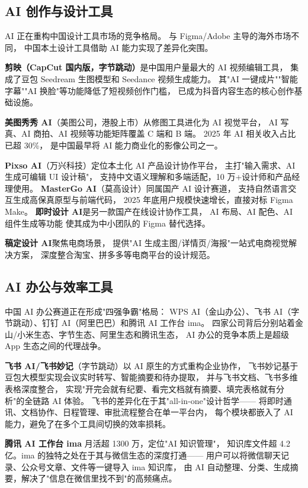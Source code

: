 \subsection{AI 创作与设计工具}
\label{subsec:china-ai-creative}

AI 正在重构中国设计工具市场的竞争格局。
与 Figma/Adobe 主导的海外市场不同，
中国本土设计工具借助 AI 能力实现了差异化突围。

\textbf{剪映（CapCut 国内版，字节跳动）}是中国用户量最大的 AI 视频编辑工具，
集成了豆包 Seedream 生图模型和 Seedance 视频生成能力。
其"AI 一键成片""智能字幕""AI 换脸"等功能降低了短视频创作门槛，
已成为抖音内容生态的核心创作基础设施。

\textbf{美图秀秀 AI}（美图公司，港股上市）从修图工具进化为 AI 视觉平台，
AI 写真、AI 商拍、AI 视频等功能矩阵覆盖 C 端和 B 端。
2025 年 AI 相关收入占比已超 30\%，
是中国最早将 AI 能力商业化的影像公司之一。

\textbf{Pixso AI}（万兴科技）定位本土化 AI 产品设计协作平台，
主打"输入需求、AI 生成可编辑 UI 设计稿"，
支持中文语义理解和多端适配，10 万+设计师和产品经理使用。
\textbf{MasterGo AI}（莫高设计）同属国产 AI 设计赛道，
支持自然语言交互生成高保真原型与前端代码，
2025 年底用户规模快速增长，直接对标 Figma Make。
\textbf{即时设计 AI}是另一款国产在线设计协作工具，
AI 布局、AI 配色、AI 组件生成等功能
使其成为中小团队的 Figma 替代选择。

\textbf{稿定设计 AI}聚焦电商场景，
提供"AI 生成主图/详情页/海报"一站式电商视觉解决方案，
深度整合淘宝、拼多多等电商平台的设计规范。

\subsection{AI 办公与效率工具}
\label{subsec:china-ai-office}

中国 AI 办公赛道正在形成"四强争霸"格局：
WPS AI（金山办公）、飞书 AI（字节跳动）、钉钉 AI（阿里巴巴）和腾讯 AI 工作台 ima。
四家公司背后分别站着金山/小米生态、字节生态、阿里生态和腾讯生态，
AI 办公的竞争本质上是超级 App 生态之间的代理战争。

\textbf{飞书 AI/飞书妙记}（字节跳动）以 AI 原生的方式重构企业协作，
飞书妙记基于豆包大模型实现会议实时转写、智能摘要和待办提取，
并与飞书文档、飞书多维表格深度整合，
实现"开完会就有纪要、看完文档就有摘要、填完表格就有分析"的全链路 AI 体验。
飞书的差异化在于其"all-in-one"设计哲学——
将即时通讯、文档协作、日程管理、审批流程整合在单一平台内，
每个模块都嵌入了 AI 能力，避免了在多个工具间切换的效率损耗。

\textbf{腾讯 AI 工作台 ima} 月活超 1300 万，定位"AI 知识管理"，
知识库文件超 4.2 亿。ima 的独特之处在于其与微信生态的深度打通——
用户可以将微信聊天记录、公众号文章、文件等一键导入 ima 知识库，
由 AI 自动整理、分类、生成摘要，解决了"信息在微信里找不到"的高频痛点。

